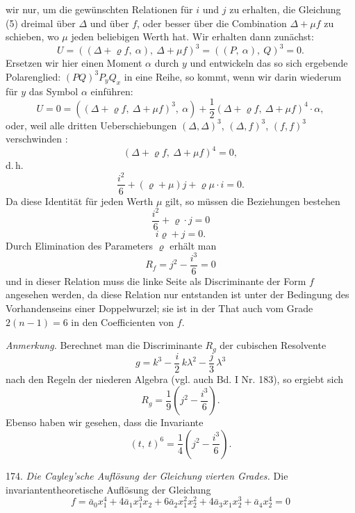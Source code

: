 \documentclass[11pt]{article}
\providecommand{\weberpage}[1]{}
\providecommand{\weq}[2]{\begin{equation}\tag{#1}#2\end{equation}}
\begin{document}
\weberpage{192}
wir nur, um die gewünschten Relationen für $i$ und $j$ zu erhalten,
die Gleichung (5) dreimal über $\varDelta$ und über $f$, oder besser über die Combination
 $\varDelta+\mu f$ zu schieben, wo $\mu$ jeden beliebigen Werth hat. Wir
erhalten dann zunächst:
\[
U = ((\varDelta+\varrho f,\ \alpha),\ \varDelta+\mu f)^3 = ((P,\ \alpha),\ Q)^3 = 0.
\]
Ersetzen wir hier einen Moment $\alpha$ durch $y$ und entwickeln das so
sich ergebende Polarenglied: $(PQ)^3 P_y Q_x$ in eine Reihe, so kommt,
wenn wir darin wiederum für $y$ das Symbol $\alpha$ einführen:
\[
U = 0 = ((\varDelta+\varrho f,\ \varDelta+\mu f)^3,\ \alpha) + \frac{1}{2}(\varDelta+\varrho f,\ \varDelta+\mu f)^4\cdot\alpha,
\]
oder, weil alle dritten Ueberschiebungen $(\varDelta,\varDelta)^3$, $(\varDelta,f)^3$, $(f,f)^3$ verschwinden
:
\[
(\varDelta+\varrho f,\ \varDelta+\mu f)^4 = 0,
\]
d.\,h.
\weq{6}{\frac{i^2}{6} + (\varrho+\mu)j + \varrho\mu\cdot i = 0.}
Da diese Identität für jeden Werth $\mu$ gilt, so müssen die Beziehungen
bestehen
\[
\frac{i^2}{6} + \varrho\cdot j = 0
\]
\[
i\varrho + j = 0.
\]
Durch Elimination des Parameters $\varrho$ erhält man
\[
R_f = j^2 - \frac{i^3}{6} = 0
\]
und in dieser Relation muss die linke Seite als Discriminante der
Form $f$ angesehen werden, da diese Relation nur entstanden ist unter
der Bedingung des Vorhandenseins einer Doppelwurzel; sie ist in der
That auch vom Grade $2(n-1)=6$ in den Coefficienten von $f$.

\textit{Anmerkung.} Berechnet man die Discriminante $R_g$ der cubischen
Resolvente
\[
g = k^3 - \frac{i}{2}\,k\lambda^2 - \frac{j}{3}\,\lambda^3
\]
nach den Regeln der niederen Algebra (vgl. auch Bd. I Nr. 183), so
ergiebt sich
\[
R_g = \frac{1}{9}\left(j^2 - \frac{i^3}{6}\right).
\]
Ebenso haben wir gesehen, dass die Invariante
\[
(t,\ t)^6 = \frac{1}{4}\left(j^2 - \frac{i^3}{6}\right).
\]

174. \textit{Die Cayley'sche Auflösung der Gleichung vierten Grades.} Die
invariantentheoretische Auflösung der Gleichung
\[
f = \bar a_0 x_1^4 + 4\bar a_1 x_1^3 x_2 + 6\bar a_2 x_1^2 x_2^2 + 4\bar a_3 x_1 x_2^3 + \bar a_4 x_2^4 = 0
\]
\end{document}
